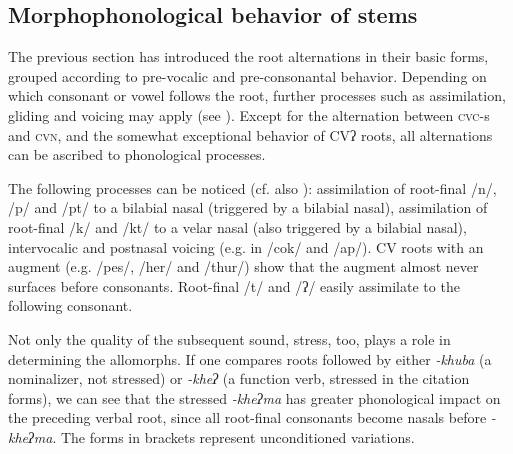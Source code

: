 \subsection{Morphophonological behavior of stems}\label{stem-2}

The previous section has introduced the root alternations in their basic forms, grouped according to pre-vocalic and pre-consonantal behavior. Depending on which consonant or vowel follows the root, further processes such as assimilation, gliding and voicing may apply (see ).  Except for the alternation between \textsc{cvc}-s and \textsc{cvn}, and the somewhat exceptional behavior of CVʔ roots, all alternations can be ascribed to phonological processes.

The following processes can be noticed (cf. also ): assimilation of root-final /n/, /p/ and /pt/ to a bilabial nasal (triggered by a bilabial nasal), assimilation of root-final /k/ and /kt/ to  a velar nasal (also triggered by a bilabial nasal), intervocalic and postnasal voicing (e.g. in /cok/ and /ap/). CV roots with an augment (e.g. /pes/, /her/ and /thur/) show that the augment almost never surfaces before consonants. Root-final /t/ and /ʔ/ easily assimilate to the following consonant.

Not only the quality of the subsequent sound,  stress, too, plays a role in determining the allomorphs. If one compares roots followed by either \emph{-khuba} (a nominalizer, not stressed) or \emph{-kheʔ} (a function verb, stressed in the citation forms), we can see that the stressed \emph{-kheʔma} has greater phonological impact on the preceding verbal root, since all root-final consonants become nasals before \emph{-kheʔma}. The forms in brackets represent unconditioned variations.

